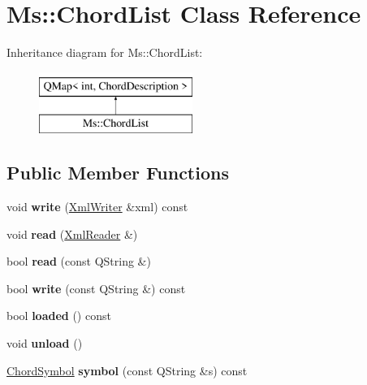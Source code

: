 \hypertarget{class_ms_1_1_chord_list}{}\section{Ms\+:\+:Chord\+List Class Reference}
\label{class_ms_1_1_chord_list}
Inheritance diagram for Ms\+:\+:Chord\+List\+:\begin{figure}[H]
\begin{center}
\leavevmode
\includegraphics[height=2.000000cm]{class_ms_1_1_chord_list}
\end{center}
\end{figure}
\subsection*{Public Member Functions}
\begin{DoxyCompactItemize}
\item 
\mbox{\label{class_ms_1_1_chord_list_aa560d8927689be2f58ad549266118b76}} 
void {\bfseries write} (\hyperlink{class_ms_1_1_xml_writer}{Xml\+Writer} \&xml) const
\item 
\mbox{\label{class_ms_1_1_chord_list_a694a93f0c0acba0290a1bb9a8a28d580}} 
void {\bfseries read} (\hyperlink{class_ms_1_1_xml_reader}{Xml\+Reader} \&)
\item 
\mbox{\label{class_ms_1_1_chord_list_a1c0af6e6a8c71f3ac5d8a0c71ad56265}} 
bool {\bfseries read} (const Q\+String \&)
\item 
\mbox{\label{class_ms_1_1_chord_list_a52944b269b87143ddce61e9d3af65261}} 
bool {\bfseries write} (const Q\+String \&) const
\item 
\mbox{\label{class_ms_1_1_chord_list_a68c1ddd64fcb28a3c2ed8cb7d5256491}} 
bool {\bfseries loaded} () const
\item 
\mbox{\label{class_ms_1_1_chord_list_ad564d20f0749fd88446f9c1c8174be26}} 
void {\bfseries unload} ()
\item 
\mbox{\label{class_ms_1_1_chord_list_ac93e9e2b6a2b5222a5fe901f62231ad1}} 
\hyperlink{struct_ms_1_1_chord_symbol}{Chord\+Symbol} {\bfseries symbol} (const Q\+String \&s) const
\end{DoxyCompactItemize}
